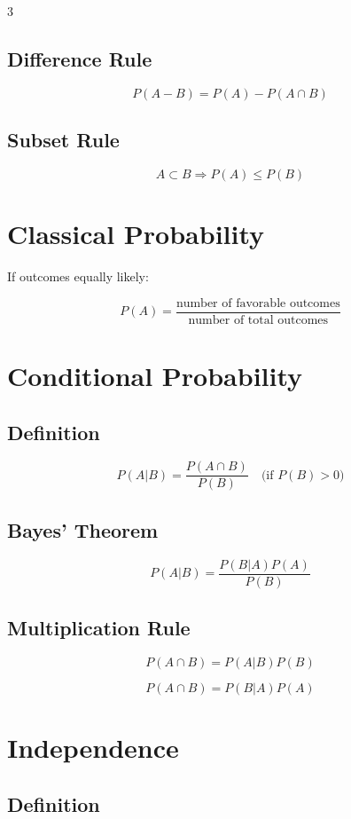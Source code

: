 \documentclass[10pt]{article}
\begin{document}
\begin{multicols}{3}
\subsection*{Difference Rule}
\[
P(A - B) = P(A) - P(A \cap B)
\]

\subsection*{Subset Rule}
\[
A \subset B \Rightarrow P(A) \le P(B)
\]

\section*{Classical Probability}

If outcomes equally likely:

\[
P(A) = \frac{\text{number of favorable outcomes}}
{\text{number of total outcomes}}
\]

\section*{Conditional Probability}

\subsection*{Definition}
\[
P(A|B) = \frac{P(A \cap B)}{P(B)}
\quad \text{(if } P(B) > 0)
\]

\subsection*{Bayes' Theorem}

\[
P(A|B) = \frac{P(B|A)P(A)}{P(B)}
\]

\subsection*{Multiplication Rule}
\[
P(A \cap B) = P(A|B) P(B)
\]

\[
P(A \cap B) = P(B|A) P(A)
\]

\section*{Independence}

\subsection*{Definition}


\end{multicols}
\end{document}
